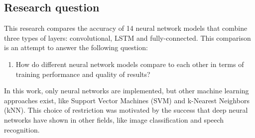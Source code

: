\subsection{Research question}
This research compares the accuracy of 14 neural network models that combine three types of layers: convolutional, LSTM and fully-connected. This comparison is an attempt to answer the following question:

\begin{enumerate}[itemindent=\parindent,label=\textbf{Q\arabic*.}]

    \item How do different neural network models compare to each other in terms of training performance and quality of results?
    
\end{enumerate}

In this work, only neural networks are implemented, but other machine learning approaches exist, like Support Vector Machines (SVM) and k-Nearest Neighbors (kNN). This choice of restriction was motivated by the success that deep neural networks have shown in other fields, like image classification and speech recognition.



